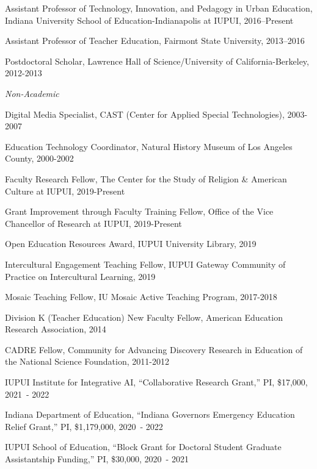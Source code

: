 \documentclass[11pt,article,oneside]{memoir}
\begin{document}
\ind Assistant Professor of Technology, Innovation, and Pedagogy in Urban Education,  Indiana University School of Education-Indianapolis at IUPUI, 2016--Present

\ind Assistant Professor of Teacher Education, Fairmont State University, 2013--2016

\ind Postdoctoral Scholar, Lawrence Hall of Science/University of California-Berkeley, 2012-2013

\bigskip

\noindent\emph{Non-Academic \vspace{0.01in}}

\ind Digital Media Specialist, CAST (Center for Applied Special Technologies), 2003-2007

\ind Education Technology Coordinator, Natural History Museum of Los Angeles County, 2000-2002

\bigskip


\medskip

\ind Faculty Research Fellow, The Center for the Study of Religion \& American Culture at IUPUI, 2019-Present

\ind Grant Improvement through Faculty Training Fellow, Office of the Vice Chancellor of Research at IUPUI, 2019-Present

\ind Open Education Resources Award, IUPUI University Library, 2019

\ind Intercultural Engagement Teaching Fellow, IUPUI Gateway Community of Practice on Intercultural Learning, 2019

\ind Mosaic Teaching Fellow, IU Mosaic Active Teaching Program, 2017-2018

\ind Division K (Teacher Education) New Faculty Fellow, American Education Research Association, 2014

\ind CADRE Fellow, Community for Advancing Discovery Research in Education of the National Science Foundation, 2011-2012

\bigskip


\medskip

  

      \ind IUPUI Institute for Integrative AI, ``Collaborative Research Grant,'' PI, \$17,000, 2021~- 2022

      \ind Indiana Department of Education, ``Indiana Governors Emergency Education Relief Grant,'' PI, \$1,179,000, 2020~- 2022

      \ind IUPUI School of Education, ``Block Grant for Doctoral Student Graduate Assistantship Funding,'' PI, \$30,000, 2020~- 2021
\end{document}
